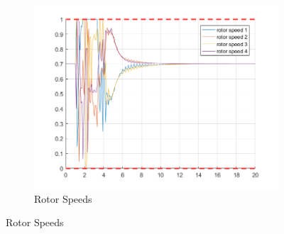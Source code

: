 \documentclass[11pt]{article}
\begin{document}
\begin{enumerate}
\begin{figure}[ht]
\begin{subfigure}[c]{0.3\linewidth}
            \includegraphics[width=\linewidth]{Plots_07_NonlinearModel_ReferenceTracking/06}
            \caption{Rotor Speeds}
        \end{subfigure}


\end{figure}
\end{enumerate}
\end{document}
